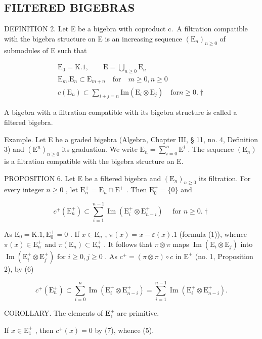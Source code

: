 \subsection{FILTERED BIGEBRAS}

DEFINITION 2. Let E be a bigebra with coproduct c.~A filtration compatible with the bigebra structure on E is an increasing sequence \((\mathrm{E}_{n})_{n\geq0}\) of submodules of E such that

\[
\begin{array}{c} \mathrm{E} _ {0} = \mathrm{K}. 1, \qquad \mathrm{E} = \bigcup_ {n \geqslant 0} \mathrm{E} _ {n} \\ \mathrm{E} _ {m}. \mathrm{E} _ {n} \subset \mathrm{E} _ {m + n} \quad \text {for} \quad m \geqslant 0, n \geqslant 0 \\ c (\mathrm{E} _ {n}) \subset \sum_ {i + j = n} \mathrm{Im} (\mathrm{E} _ {i} \otimes \mathrm{E} _ {j}) \quad \text {for} n \geqslant 0. \dagger \end{array}\tag{6}
\]

A bigebra with a filtration compatible with its bigebra structure is called a filtered bigebra.

Example. Let E be a graded bigebra (Algebra, Chapter III, § 11, no. 4, Definition 3) and \((\mathrm{E}^n)_{n\geqslant 0}\) its graduation. We write \(\mathrm{E}_n = \sum_{i = 0}^{n}\mathrm{E}^i\) . The sequence \((\mathrm{E}_n)\) is a filtration compatible with the bigebra structure on E.

PROPOSITION 6. Let E be a filtered bigebra and \((\mathrm{E}_n)_{n\geqslant 0}\) its filtration. For every integer \(n\geqslant 0\) , let \(\mathrm{E}_n^+ = \mathrm{E}_n\cap \mathrm{E}^+\) . Then \(\mathrm{E_0^+} = \{0\}\) and

\[
c ^ {+} (\mathrm{E} _ {n} ^ {+}) \subset \sum_ {i = 1} ^ {n - 1} \operatorname{Im} (\mathrm{E} _ {i} ^ {+} \otimes \mathrm{E} _ {n - i} ^ {+}) \quad \text { for } n \geqslant 0. \dagger\tag{7}
\]

As \(\mathrm{E}_0 = \mathrm{K}.1, \mathrm{E}_0^+ = 0\) . If \(x \in \mathrm{E}_n\) , \(\pi(x) = x - \varepsilon(x).1\) (formula (1)), whence \(\pi(x) \in \mathrm{E}_n^+\) and \(\pi(\mathrm{E}_n) \subset \mathrm{E}_n^+\) . It follows that \(\pi \otimes \pi\) maps \(\operatorname{Im}(\mathrm{E}_i \otimes \mathrm{E}_j)\) into \(\operatorname{Im}(\mathrm{E}_i^+ \otimes \mathrm{E}_j^+)\) for \(i \geqslant 0, j \geqslant 0\) . As \(c^+ = (\pi \otimes \pi) \circ c\) in \(\mathrm{E}^+\) (no. 1, Proposition 2), by (6)

\[
c ^ {+} \left(\mathrm{E} _ {n} ^ {+}\right) \subset \sum_ {i = 0} ^ {n} \operatorname{Im} \left(\mathrm{E} _ {i} ^ {+} \otimes \mathrm{E} _ {n - i} ^ {+}\right) = \sum_ {i = 1} ^ {n - 1} \operatorname{Im} \left(\mathrm{E} _ {i} ^ {+} \otimes \mathrm{E} _ {n - i} ^ {+}\right).
\]

COROLLARY. The elements of \(\mathbf{E}_1^+\) are primitive.

If \(x \in \mathrm{E}_{1}^{+}\) , then \(c^{+}(x) = 0\) by (7), whence (5).

